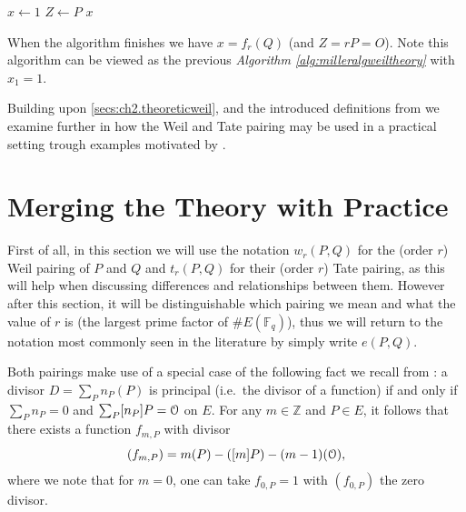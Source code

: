 \begin{algorithm}
	\label{alg:milleralgorithmtate}
	\caption{Miller's algorithm for Tate pairing. $x = f_P(Q)$}
	$x \leftarrow 1$\;
	$Z \leftarrow P$\;
	\Return $x$\;
\end{algorithm}

When the algorithm finishes we have $x = f_r(Q)$ (and $Z = rP = O$). Note this algorithm can be viewed as the previous \textit{Algorithm \ref{alg:milleralgweiltheory}} with $x_1 = 1$.

Building upon \ref{secs:ch2.theoreticweil},  and the introduced definitions from  we examine further in  how the Weil and Tate pairing may be used in a practical setting trough examples motivated by \cite{theory.pairings.for.beginners}. 

\section{Merging the Theory with Practice}
\label{ssec:weilandtatepairingpractice}

First of all, in this section we will use the notation $w_r(P, Q)$
for the (order $r$) Weil pairing of $P$ and $Q$ and $t_r(P, Q)$ for their
(order $r$) Tate pairing, as this will help when discussing differences and
relationships between them.  However after this section, it will be distinguishable 
 which pairing we mean and what the value of $r$ is (the largest prime
factor of $\#E(\mathbb{F}_q)$), thus we will return to the notation most
commonly seen in the literature by simply write $e(P, Q)$.


Both pairings make use of a special case of the following fact we recall from : a divisor $D = \sum_P n_P(P)$ is principal (i.e.\ the divisor of a
function) if and only if $\sum_P n_P = 0$ and $\sum_P [n_P]P = \EuScript{O}$
on $E$. For any $m \in \mathbb{Z}$ and $P \in E$, it follows that there exists
a function $f_{m,P}$ with divisor
\begin{equation}\label{eq:miller-divisor}
	(f_{m,P}) = m(P) - ([m]P) - (m-1)(\EuScript{O}),
\end{equation}
where we note that for $m = 0$, one can take $f_{0,P} = 1$ with $(f_{0,P})$
the zero divisor.

